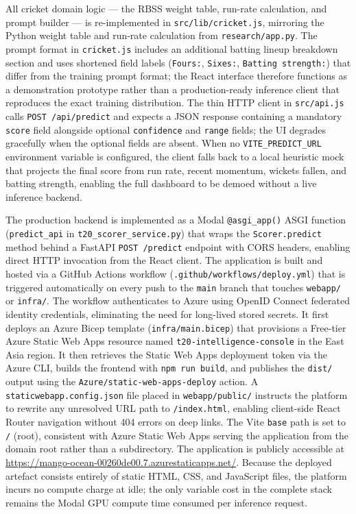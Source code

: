 All cricket domain logic --- the RBSS weight table, run-rate calculation, and prompt builder --- is re-implemented in \texttt{src/lib/cricket.js}, mirroring the Python weight table and run-rate calculation from \texttt{research/app.py}. The prompt format in \texttt{cricket.js} includes an additional batting lineup breakdown section and uses shortened field labels (\texttt{Fours:}, \texttt{Sixes:}, \texttt{Batting strength:}) that differ from the training prompt format; the React interface therefore functions as a demonstration prototype rather than a production-ready inference client that reproduces the exact training distribution. The thin HTTP client in \texttt{src/api.js} calls \texttt{POST /api/predict} and expects a JSON response containing a mandatory \texttt{score} field alongside optional \texttt{confidence} and \texttt{range} fields; the UI degrades gracefully when the optional fields are absent. When no \texttt{VITE\_PREDICT\_URL} environment variable is configured, the client falls back to a local heuristic mock that projects the final score from run rate, recent momentum, wickets fallen, and batting strength, enabling the full dashboard to be demoed without a live inference backend.

The production backend is implemented as a Modal \texttt{@asgi\_app()} ASGI function (\texttt{predict\_api} in \texttt{t20\_scorer\_service.py}) that wraps the \texttt{Scorer.predict} method behind a FastAPI \texttt{POST /predict} endpoint with CORS headers, enabling direct HTTP invocation from the React client. The application is built and hosted via a GitHub Actions workflow (\texttt{.github/workflows/deploy.yml}) that is triggered automatically on every push to the \texttt{main} branch that touches \texttt{webapp/} or \texttt{infra/}. The workflow authenticates to Azure using OpenID Connect federated identity credentials, eliminating the need for long-lived stored secrets. It first deploys an Azure Bicep template (\texttt{infra/main.bicep}) that provisions a Free-tier Azure Static Web Apps resource named \texttt{t20-intelligence-console} in the East Asia region. It then retrieves the Static Web Apps deployment token via the Azure CLI, builds the frontend with \texttt{npm run build}, and publishes the \texttt{dist/} output using the \texttt{Azure/static-web-apps-deploy} action. A \texttt{staticwebapp.config.json} file placed in \texttt{webapp/public/} instructs the platform to rewrite any unresolved URL path to \texttt{/index.html}, enabling client-side React Router navigation without 404 errors on deep links. The Vite \texttt{base} path is set to \texttt{/} (root), consistent with Azure Static Web Apps serving the application from the domain root rather than a subdirectory. The application is publicly accessible at \url{https://mango-ocean-00260de00.7.azurestaticapps.net/}. Because the deployed artefact consists entirely of static HTML, CSS, and JavaScript files, the platform incurs no compute charge at idle; the only variable cost in the complete stack remains the Modal GPU compute time consumed per inference request.
